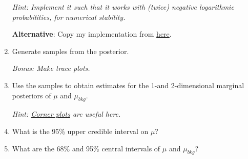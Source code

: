 \documentclass{article}
\begin{document}
\begin{enumerate}
    \textit{Hint: Implement it such that it works with (twice) negative logarithmic probabilities, for numerical stability.}

    \textbf{Alternative}: Copy my implementation from \href{https://github.com/lorenzennio/icsc-bayesian-inference/blob/main/mcmc.py}{here}.

    \item Generate samples from the posterior.

    \textit{Bonus: Make trace plots.}

    \item Use the samples to obtain estimates for the 1-and 2-dimensional marginal posteriors of $\mu$ and $\mu_{bkg}$.

    \textit{Hint: \href{https://corner.readthedocs.io/en/latest/}{Corner plots} are useful here.}

    \item What is the 95\% upper credible interval on $\mu$?

    \item What are the 68\% and 95\% central intervals of $\mu$ and $\mu_{bkg}$?
    

\end{enumerate}
\end{document}
